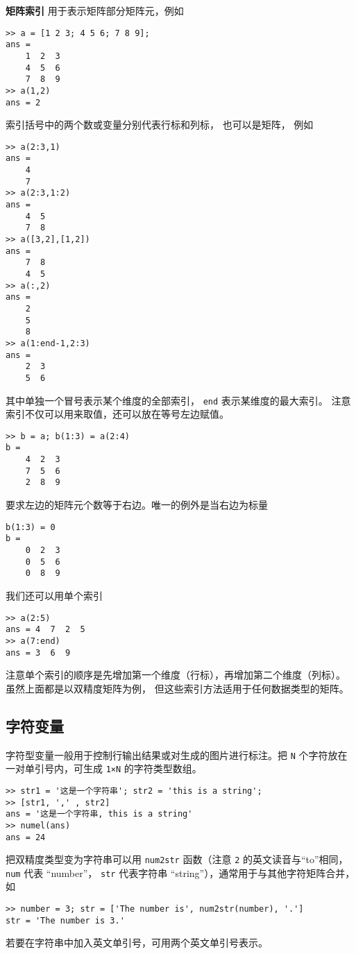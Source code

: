 \textbf{矩阵索引} 用于表示矩阵部分矩阵元，例如
\begin{lstlisting}[language=matlabC]
>> a = [1 2 3; 4 5 6; 7 8 9];
ans =
    1  2  3
    4  5  6
    7  8  9
>> a(1,2)
ans = 2
\end{lstlisting}
索引括号中的两个数或变量分别代表行标和列标， 也可以是矩阵， 例如
\begin{lstlisting}[language=matlabC]
>> a(2:3,1)
ans =
    4
    7
>> a(2:3,1:2)
ans =
    4  5
    7  8
>> a([3,2],[1,2])
ans =
    7  8
    4  5
>> a(:,2)
ans =
    2
    5
    8
>> a(1:end-1,2:3)
ans =
    2  3
    5  6
\end{lstlisting}
其中单独一个冒号表示某个维度的全部索引， \verb|end| 表示某维度的最大索引。 注意索引不仅可以用来取值，还可以放在等号左边赋值。
\begin{lstlisting}[language=matlabC]
>> b = a; b(1:3) = a(2:4)
b =
    4  2  3
    7  5  6
    2  8  9
\end{lstlisting}
要求左边的矩阵元个数等于右边。唯一的例外是当右边为标量
\begin{lstlisting}[language=matlabC]
b(1:3) = 0
b =
    0  2  3
    0  5  6
    0  8  9 
\end{lstlisting}
我们还可以用单个索引 %
\begin{lstlisting}[language=matlabC]
>> a(2:5)
ans = 4  7  2  5
>> a(7:end)
ans = 3  6  9
\end{lstlisting}
注意单个索引的顺序是先增加第一个维度（行标），再增加第二个维度（列标）。 虽然上面都是以双精度矩阵为例， 但这些索引方法适用于任何数据类型的矩阵。

\subsection{字符变量}

字符型变量一般用于控制行输出结果或对生成的图片进行标注。把 \verb|N| 个字符放在一对单引号内，可生成 \verb|1×N| 的字符类型数组。
\begin{lstlisting}[language=matlabC]
>> str1 = '这是一个字符串'; str2 = 'this is a string';
>> [str1, ',' , str2]
ans = '这是一个字符串, this is a string'
>> numel(ans)
ans = 24
\end{lstlisting}
把双精度类型变为字符串可以用 \verb|num2str| 函数（注意 \verb|2| 的英文读音与“to”相同， \verb|num| 代表 “number”， \verb|str| 代表字符串 “string”），通常用于与其他字符矩阵合并，如
\begin{lstlisting}[language=matlabC]
>> number = 3; str = ['The number is', num2str(number), '.']
str = 'The number is 3.'
\end{lstlisting}
若要在字符串中加入英文单引号，可用两个英文单引号表示。

